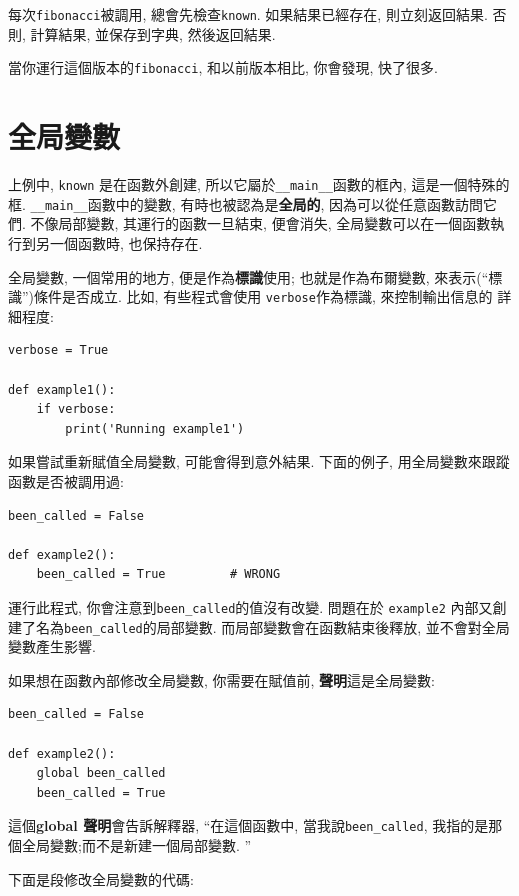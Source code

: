 \documentclass[10pt]{book}
\begin{document}
每次{\tt fibonacci}被調用, 總會先檢查{\tt known}. 
如果結果已經存在, 則立刻返回結果. 否則, 計算結果, 
並保存到字典, 然後返回結果. 

當你運行這個版本的{\tt fibonacci}, 和以前版本相比, 
你會發現, 快了很多. 


\section{全局變數}
上例中, {\tt known} 是在函數外創建, 
所以它屬於\verb"__main__"函數的框內, 這是一個特殊的框. 
\verb"__main__"函數中的變數, 有時也被認為是{\bf 全局的}, 
因為可以從任意函數訪問它們. 
不像局部變數, 其運行的函數一旦結束, 便會消失, 
全局變數可以在一個函數執行到另一個函數時, 也保持存在. 

全局變數, 一個常用的地方, 便是作為{\bf 標識}使用;
也就是作為布爾變數, 來表示(``標識'')條件是否成立. 
比如, 有些程式會使用 {\tt verbose}作為標識, 來控制輸出信息的
詳細程度:

\begin{verbatim}
verbose = True

def example1():
    if verbose:
        print('Running example1')
\end{verbatim}
%
如果嘗試重新賦值全局變數, 可能會得到意外結果. 
下面的例子, 用全局變數來跟蹤函數是否被調用過:

\begin{verbatim}
been_called = False

def example2():
    been_called = True         # WRONG
\end{verbatim}
%
運行此程式, 你會注意到\verb"been_called"的值沒有改變. 
問題在於 {\tt example2} 內部又創建了名為\verb"been_called"的局部變數. 
而局部變數會在函數結束後釋放, 並不會對全局變數產生影響. 

如果想在函數內部修改全局變數, 你需要在賦值前, {\bf 聲明}這是全局變數:

\begin{verbatim}
been_called = False

def example2():
    global been_called 
    been_called = True
\end{verbatim}
%
這個{\bf global 聲明}會告訴解釋器,  ``在這個函數中, 當我說\verb"been_called", 
我指的是那個全局變數;而不是新建一個局部變數. ''

下面是段修改全局變數的代碼:
\end{document}
